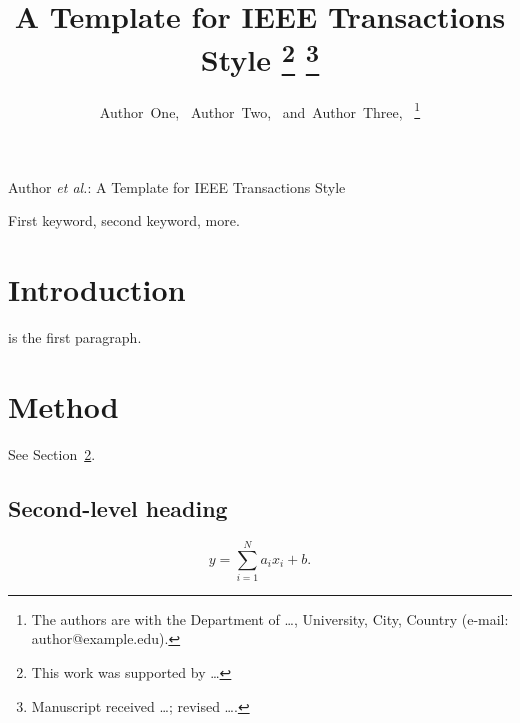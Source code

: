 \documentclass[lettersize,journal]{IEEEtran}
\begin{document}
\title{A Template for IEEE Transactions Style
\thanks{This work was supported by \dots}
\thanks{Manuscript received \dots; revised \dots.}}

\author{Author~One,~
        Author~Two,~
        and~Author~Three,~%
\thanks{The authors are with the Department of \dots, University, City, Country
(e-mail: author@example.edu).}}

%
{Author \MakeLowercase{\textit{et al.}}: A Template for IEEE Transactions Style}

\maketitle

\begin{abstract}
\lipsum[1]
\end{abstract}

\begin{IEEEkeywords}
First keyword, second keyword, more.
\end{IEEEkeywords}

\section{Introduction}
 is the first paragraph. \lipsum[2]

\section{Method}
\label{sec:method}
\lipsum[3] See Section~\ref{sec:method}.

\subsection{Second-level heading}
\lipsum[4]
\begin{equation}
  y = \sum_{i=1}^{N} a_i x_i + b.
  \label{eq:example}
\end{equation}
\end{document}
